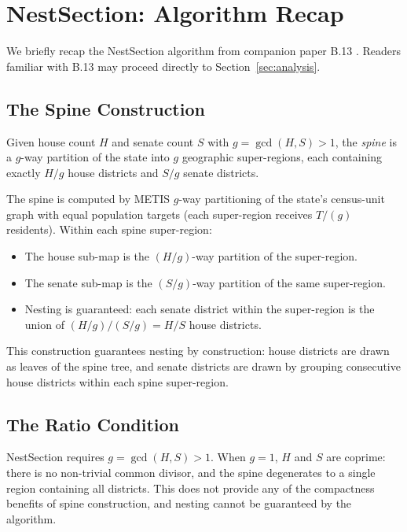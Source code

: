 \section{NestSection: Algorithm Recap}
\label{sec:nestsection}

We briefly recap the NestSection algorithm from companion paper B.13
\citep{dellaLibera2026nestSection}. Readers familiar with B.13 may proceed
directly to Section~\ref{sec:analysis}.

\subsection{The Spine Construction}
\label{sec:nestsection:spine}

\begin{definition}[Spine]
  Given house count $H$ and senate count $S$ with $g = \gcd(H, S) > 1$,
  the \emph{spine} is a $g$-way partition of the state into $g$ geographic
  super-regions, each containing exactly $H/g$ house districts and $S/g$
  senate districts.
\end{definition}

The spine is computed by METIS $g$-way partitioning of the state's
census-unit graph with equal population targets (each super-region receives
$T/(g)$ residents). Within each spine super-region:
\begin{itemize}
  \item The house sub-map is the $(H/g)$-way partition of the super-region.
  \item The senate sub-map is the $(S/g)$-way partition of the same super-region.
  \item Nesting is guaranteed: each senate district within the super-region
    is the union of $(H/g) / (S/g) = H/S$ house districts.
\end{itemize}

This construction guarantees nesting by construction: house districts are drawn
as leaves of the spine tree, and senate districts are drawn by grouping
consecutive house districts within each spine super-region.

\subsection{The Ratio Condition}
\label{sec:nestsection:ratio}

NestSection requires $g = \gcd(H, S) > 1$. When $g = 1$, $H$ and $S$ are
coprime: there is no non-trivial common divisor, and the spine degenerates to
a single region containing all districts. This does not provide any of the
compactness benefits of spine construction, and nesting cannot be guaranteed
by the algorithm.

